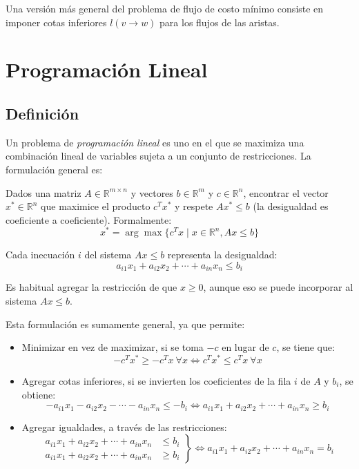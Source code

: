 \documentclass[a4paper]{report}
\newcommand{\R}{\mathbb{R}}
\begin{document}
Una versión más general del problema de flujo de costo mínimo consiste en imponer cotas inferiores $l(v \rightarrow w)$ para los flujos de las aristas.

\section{Programación Lineal}
\label{programacion-lineal}

\subsection{Definición}

Un problema de \textit{programación lineal} es uno en el que se maximiza una combinación lineal de variables sujeta a un conjunto de restricciones. La formulación general es:

\begin{problema}
    Dados una matriz $A \in \R^{m \times n}$ y vectores $b \in \R^m$ y $c \in \R^n$, encontrar el vector $x^* \in \R^n$ que maximice el producto $c^T x^*$ y respete $Ax^* \leq b$ (la desigualdad es coeficiente a coeficiente). Formalmente:
    $$x^* = \arg\max{\{c^T x \mid x \in \R^n, Ax \leq b\}}$$
\end{problema}

Cada inecuación $i$ del sistema $Ax \leq b$ representa la desigualdad:
$$a_{i1} x_1 + a_{i2} x_2 + \cdots + a_{in} x_n \leq b_i$$

Es habitual agregar la restricción de que $x \geq 0$, aunque eso se puede incorporar al sistema $Ax \leq b$.

Esta formulación es sumamente general, ya que permite:
\begin{itemize}
    \item Minimizar en vez de maximizar, si se toma $-c$ en lugar de $c$, se tiene que:
        $$-c^T x^* \geq -c^T x\ \forall x \iff c^T x^* \leq c^T x\ \forall x$$
    \item Agregar cotas inferiores, si se invierten los coeficientes de la fila $i$ de $A$ y $b_i$, se obtiene:
        $$-a_{i1} x_1 - a_{i2} x_2 - \cdots - a_{in} x_n \leq -b_i \iff a_{i1} x_1 + a_{i2} x_2 + \cdots + a_{in} x_n \geq b_i$$
    \item Agregar igualdades, a través de las restricciones:
    \begin{equation*}
        \left.\begin{aligned}
            a_{i1} x_1 + a_{i2} x_2 + \cdots + a_{in} x_n & \leq b_i \\
            a_{i1} x_1 + a_{i2} x_2 + \cdots + a_{in} x_n & \geq b_i
        \end{aligned}\right\} \iff a_{i1} x_1 + a_{i2} x_2 + \cdots + a_{in} x_n = b_i
    \end{equation*}
\end{itemize}
\end{document}

